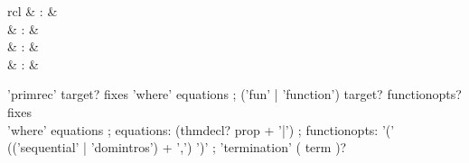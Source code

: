 \begin{isabellebody}
\begin{isamarkuptext}
\begin{description}
  \end{description}%
\end{isamarkuptext}%
\isamarkuptrue%
%
\isamarkuptrue%
%
\begin{isamarkuptext}%
\begin{matharray}{rcl}
    \hypertarget{command.HOL.primrec}{\hyperlink{command.HOL.primrec}{\mbox{}}} & : &  \\
    \hypertarget{command.HOL.fun}{\hyperlink{command.HOL.fun}{\mbox{}}} & : &  \\
    \hypertarget{command.HOL.function}{\hyperlink{command.HOL.function}{\mbox{}}} & : &  \\
    \hypertarget{command.HOL.termination}{\hyperlink{command.HOL.termination}{\mbox{}}} & : &  \\
  \end{matharray}

  \begin{rail}
    'primrec' target? fixes 'where' equations
    ;
    ('fun' | 'function') target? functionopts? fixes \\ 'where' equations
    ;
    equations: (thmdecl? prop + '|')
    ;
    functionopts: '(' (('sequential' | 'domintros') + ',') ')'
    ;
    'termination' ( term )?
  \end{rail}


\end{isamarkuptext}
\end{isabellebody}
